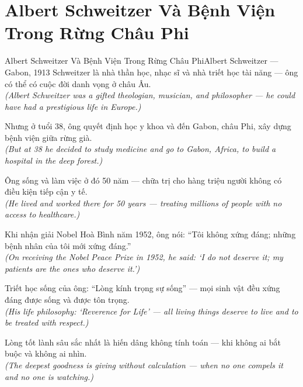 \section{Albert Schweitzer Và Bệnh Viện Trong Rừng Châu Phi}
\begin{truyen}{Albert Schweitzer Và Bệnh Viện Trong Rừng Châu Phi}{Albert Schweitzer --- Gabon, 1913}
 Schweitzer là nhà thần học, nhạc sĩ và nhà triết học tài năng --- ông có thể có cuộc đời danh vọng ở châu Âu.\\[4pt]
\textit{(Albert Schweitzer was a gifted theologian, musician, and philosopher --- he could have had a prestigious life in Europe.)}

Nhưng ở tuổi 38, ông quyết định học y khoa và đến Gabon, châu Phi, xây dựng bệnh viện giữa rừng già.\\[4pt]
\textit{(But at 38 he decided to study medicine and go to Gabon, Africa, to build a hospital in the deep forest.)}

Ông sống và làm việc ở đó 50 năm --- chữa trị cho hàng triệu người không có điều kiện tiếp cận y tế.\\[4pt]
\textit{(He lived and worked there for 50 years --- treating millions of people with no access to healthcare.)}

Khi nhận giải Nobel Hoà Bình năm 1952, ông nói: ``Tôi không xứng đáng; những bệnh nhân của tôi mới xứng đáng.''\\[4pt]
\textit{(On receiving the Nobel Peace Prize in 1952, he said: `I do not deserve it; my patients are the ones who deserve it.')}

Triết học sống của ông: ``Lòng kính trọng sự sống'' --- mọi sinh vật đều xứng đáng được sống và được tôn trọng.\\[4pt]
\textit{(His life philosophy: `Reverence for Life' --- all living things deserve to live and to be treated with respect.)}

\end{truyen}
\begin{baihoc}
  Lòng tốt lành sâu sắc nhất là hiến dâng không tính toán --- khi không ai bắt buộc và không ai nhìn.\\[4pt]
  \textit{(The deepest goodness is giving without calculation --- when no one compels it and no one is watching.)}
\end{baihoc}

